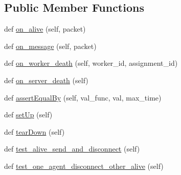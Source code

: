 \subsection*{Public Member Functions}
\begin{DoxyCompactItemize}
\item 
def \hyperlink{classparlai_1_1mturk_1_1core_1_1dev_1_1test_1_1test__socket__manager_1_1TestSocketManagerMessageHandling_a7e5074f665782799e088ae7328d62439}{on\+\_\+alive} (self, packet)
\item 
def \hyperlink{classparlai_1_1mturk_1_1core_1_1dev_1_1test_1_1test__socket__manager_1_1TestSocketManagerMessageHandling_a01ca2d8b51911eb2e930dd44cdae1185}{on\+\_\+message} (self, packet)
\item 
def \hyperlink{classparlai_1_1mturk_1_1core_1_1dev_1_1test_1_1test__socket__manager_1_1TestSocketManagerMessageHandling_a73cd339bf49a155ecef810eb881bac47}{on\+\_\+worker\+\_\+death} (self, worker\+\_\+id, assignment\+\_\+id)
\item 
def \hyperlink{classparlai_1_1mturk_1_1core_1_1dev_1_1test_1_1test__socket__manager_1_1TestSocketManagerMessageHandling_aa370a7cf8fc2cb4180cf28a06b057d5b}{on\+\_\+server\+\_\+death} (self)
\item 
def \hyperlink{classparlai_1_1mturk_1_1core_1_1dev_1_1test_1_1test__socket__manager_1_1TestSocketManagerMessageHandling_a71020e0de3b257e6d1311cfe447b0b2f}{assert\+Equal\+By} (self, val\+\_\+func, val, max\+\_\+time)
\item 
def \hyperlink{classparlai_1_1mturk_1_1core_1_1dev_1_1test_1_1test__socket__manager_1_1TestSocketManagerMessageHandling_a822b338ce726dcf695ef59db4498ab28}{set\+Up} (self)
\item 
def \hyperlink{classparlai_1_1mturk_1_1core_1_1dev_1_1test_1_1test__socket__manager_1_1TestSocketManagerMessageHandling_a6ac379f0b0dc0303890f13ffb0dd4364}{tear\+Down} (self)
\item 
def \hyperlink{classparlai_1_1mturk_1_1core_1_1dev_1_1test_1_1test__socket__manager_1_1TestSocketManagerMessageHandling_a36cf33c02aa479dd6147c0912462e6f2}{test\+\_\+alive\+\_\+send\+\_\+and\+\_\+disconnect} (self)
\item 
def \hyperlink{classparlai_1_1mturk_1_1core_1_1dev_1_1test_1_1test__socket__manager_1_1TestSocketManagerMessageHandling_ad2bf1b1103fedce7f180ecb9ca3819a6}{test\+\_\+one\+\_\+agent\+\_\+disconnect\+\_\+other\+\_\+alive} (self)
\end{DoxyCompactItemize}
